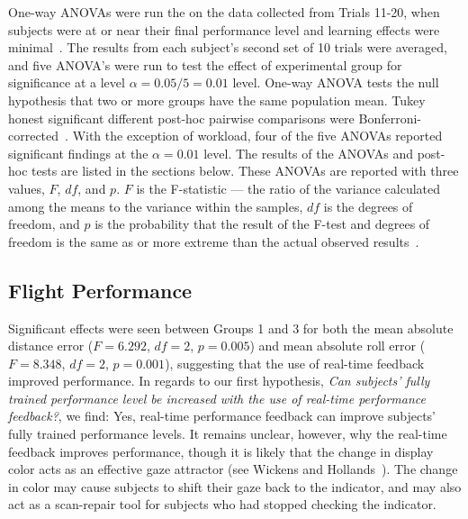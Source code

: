 \documentclass[]{aiaa-tc}%
\begin{document}
One-way ANOVAs were run the on the data collected from Trials 11-20, when subjects were at or near their final performance level and learning effects were minimal~\cite{fisher1925statistical}. The results from each subject's second set of 10 trials were averaged, and five ANOVA's were run to test the effect of experimental group for significance at a level $\alpha = 0.05/5 = 0.01$ level. One-way ANOVA tests the null hypothesis that two or more groups have the same population mean. Tukey honest significant different post-hoc pairwise comparisons were Bonferroni-corrected~\cite{tukey1949comparing}. With the exception of workload, four of the five ANOVAs reported significant findings at the $\alpha = 0.01$ level. The results of the ANOVAs and post-hoc tests are listed in the sections below. These ANOVAs are reported with three values, $F$, $df$, and $p$. $F$ is the F-statistic --- the ratio of the variance calculated among the means to the variance within the samples, $df$ is the degrees of freedom, and $p$ is the probability that the result of the F-test and degrees of freedom is the same as or more extreme than the actual observed results~\cite{wasserstein2016asa}.

\subsection{Flight Performance}
Significant effects were seen between Groups 1 and 3 for both the mean absolute distance error ($F=6.292$, $df = 2$, $p = 0.005$) and mean absolute roll error ($F=8.348$, $df = 2$, $p = 0.001$), suggesting that the use of real-time feedback improved performance. In regards to our first hypothesis, \textit{Can subjects' fully trained performance level be increased with the use of real-time performance feedback?}, we find: Yes, real-time performance feedback can improve subjects' fully trained performance levels. It remains unclear, however, why the real-time feedback improves performance, though it is likely that the change in display color acts as an effective gaze attractor (see Wickens and Hollands~\cite{wickens2015engineering}). The change in color may cause subjects to shift their gaze back to the indicator, and may also act as a scan-repair tool for subjects who had stopped checking the indicator. %
\end{document}
